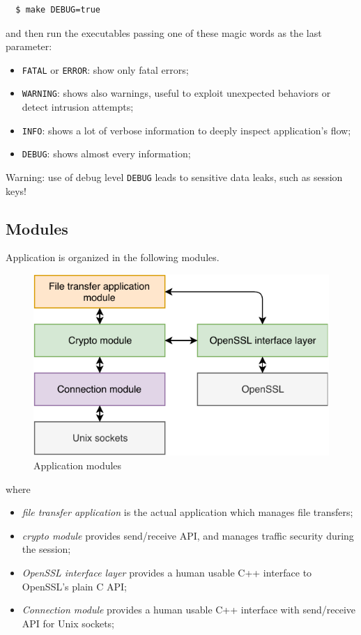 \documentclass[a4paper,12pt]{article}
\begin{document}
\begin{verbatim}
  $ make DEBUG=true
\end{verbatim}

and then run the executables passing one of these magic words as the last parameter:

\begin{itemize}
  \item \texttt{FATAL} or \texttt{ERROR}: show only fatal errors;
  \item \texttt{WARNING}: shows also warnings, useful to exploit unexpected behaviors or detect intrusion attempts;
  \item \texttt{INFO}: shows a lot of verbose information to deeply inspect application's flow;
  \item \texttt{DEBUG}: shows almost every information;
\end{itemize}

Warning: use of debug level \texttt{DEBUG} leads to sensitive data leaks, such as session keys!

\subsection{Modules}
Application is organized in the following modules.

\begin{figure}[H]
  \centering
  \includegraphics{img/modules.pdf}
  \caption{Application modules}
  \label{img:modules}
\end{figure}

where
\begin{itemize}
  \item \emph{file transfer application} is the actual application which manages file transfers;
  \item \emph{crypto module} provides send/receive API, and manages traffic security during the session;
  \item \emph{OpenSSL interface layer} provides a human usable C++ interface to OpenSSL's plain C API;
  \item \emph{Connection module} provides a human usable C++ interface with send/receive API for Unix sockets;
\end{itemize}
\end{document}
